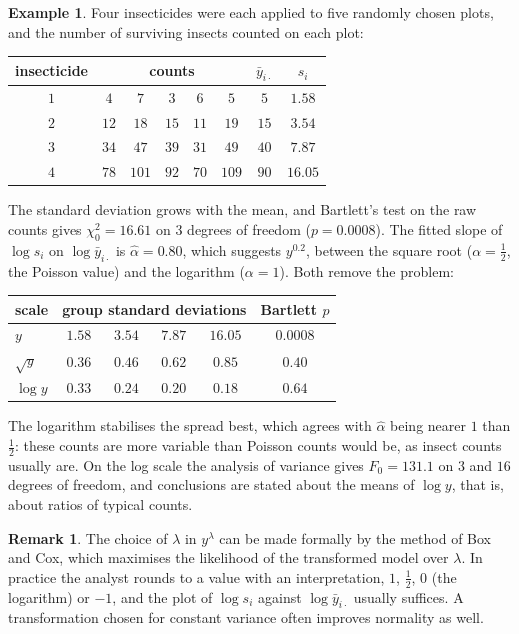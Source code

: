 \documentclass[11pt,a4paper]{article}
\numberwithin{equation}{section}
\theoremstyle{definition}
\newtheorem{exa}[thm]{Example}
\newtheorem*{remark}{Remark}
\begin{document}
\begin{exa}\label{exa:insects}
Four insecticides were each applied to five randomly chosen plots, and the number of surviving insects counted on each plot:
\begin{center}
\begin{tabular}{c|ccccc|cc}
insecticide & \multicolumn{5}{c|}{counts} & $\bar y_{i\cdot}$ & $s_i$ \\
\hline
$1$ & $4$ & $7$ & $3$ & $6$ & $5$ & $5$ & $1.58$ \\
$2$ & $12$ & $18$ & $15$ & $11$ & $19$ & $15$ & $3.54$ \\
$3$ & $34$ & $47$ & $39$ & $31$ & $49$ & $40$ & $7.87$ \\
$4$ & $78$ & $101$ & $92$ & $70$ & $109$ & $90$ & $16.05$
\end{tabular}
\end{center}
The standard deviation grows with the mean, and Bartlett's test on the raw counts gives $\chi_0^2 = 16.61$ on $3$ degrees of freedom ($p = 0.0008$). The
fitted slope of $\log s_i$ on $\log\bar y_{i\cdot}$ is $\hat\alpha = 0.80$, which suggests $y^{0.2}$, between the square root ($\alpha = \frac12$, the Poisson value) and the
logarithm ($\alpha = 1$). Both remove the problem:
\begin{center}
\begin{tabular}{l|cccc|c}
scale & \multicolumn{4}{c|}{group standard deviations} & Bartlett $p$ \\
\hline
$y$ & $1.58$ & $3.54$ & $7.87$ & $16.05$ & $0.0008$ \\
$\sqrt y$ & $0.36$ & $0.46$ & $0.62$ & $0.85$ & $0.40$ \\
$\log y$ & $0.33$ & $0.24$ & $0.20$ & $0.18$ & $0.64$
\end{tabular}
\end{center}
The logarithm stabilises the spread best, which agrees with $\hat\alpha$ being nearer $1$ than $\frac12$: these counts are more variable than Poisson counts
would be, as insect counts usually are. On the log scale the analysis of variance gives $F_0 = 131.1$ on $3$ and $16$ degrees of freedom, and conclusions
are stated about the means of $\log y$, that is, about ratios of typical counts.
\end{exa}

\begin{remark}
The choice of $\lambda$ in $y^\lambda$ can be made formally by the method of Box and Cox, which maximises the likelihood of the transformed model over
$\lambda$. In practice the analyst rounds to a value with an interpretation, $1$, $\frac12$, $0$ (the logarithm) or $-1$, and the plot of $\log s_i$ against
$\log\bar y_{i\cdot}$ usually suffices. A transformation chosen for constant variance often improves normality as well.
\end{remark}
\end{document}
